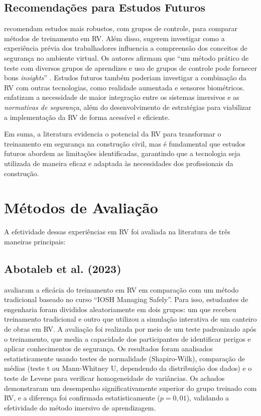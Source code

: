 \subsection{Recomendações para Estudos Futuros}

 recomendam estudos mais robustos, com grupos de controle, para comparar métodos de treinamento em RV. Além disso, sugerem investigar como a experiência prévia dos trabalhadores influencia a compreensão dos conceitos de segurança no ambiente virtual. Os autores afirmam que ``um método prático de teste com diversos grupos de aprendizes e uso de grupos de controle pode fornecer bons \textit{insights}'' \cite[p.~14]{akindele2024}. Estudos futuros também poderiam investigar a combinação da RV com outras tecnologias, como realidade aumentada e sensores biométricos.  enfatizam a necessidade de maior integração entre os sistemas imersivos e as \textit{normativas de segurança}, além do desenvolvimento de estratégias para viabilizar a implementação da RV de forma acessível e eficiente.

Em suma, a literatura evidencia o potencial da RV para transformar o treinamento em segurança na construção civil, mas é fundamental que estudos futuros abordem as limitações identificadas, garantindo que a tecnologia seja utilizada de maneira eficaz e adaptada às necessidades dos profissionais da construção.

\section{Métodos de Avaliação}

A efetividade dessas experiências em RV foi avaliada na literatura de três maneiras principais:

\subsection{Abotaleb et al. (2023)}

 avaliaram a eficácia do treinamento em RV em comparação com um método tradicional baseado no curso ``IOSH Managing Safely\textregistered''. Para isso, estudantes de engenharia foram divididos aleatoriamente em dois grupos: um que recebeu treinamento tradicional e outro que utilizou a simulação interativa de um canteiro de obras em RV. A avaliação foi realizada por meio de um teste padronizado após o treinamento, que media a capacidade dos participantes de identificar perigos e aplicar conhecimentos de segurança. Os resultados foram analisados estatisticamente usando testes de normalidade (Shapiro-Wilk), comparação de médias (teste t ou Mann-Whitney U, dependendo da distribuição dos dados) e o teste de Levene para verificar homogeneidade de variâncias. Os achados demonstraram um desempenho significativamente superior do grupo treinado com RV, e a diferença foi confirmada estatisticamente ($p = 0{,}01$), validando a efetividade do método imersivo de aprendizagem.

